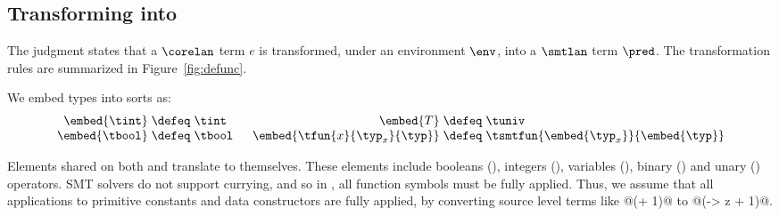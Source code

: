 \subsection{Transforming \corelan into \smtlan}
%
\label{subsec:embedding}


%
The judgment
states that a $\corelan$ term $e$ is transformed,
under an environment $\env$, into a
$\smtlan$ term $\pred$.
%
The transformation rules are summarized in Figure~\ref{fig:defunc}.

%
We embed \corelan types into \smtlan sorts as:
%
\[\arraycolsep=1.4pt
\begin{array}{rclcrcl}
\embed{\tint}                       & \defeq &  \tint & \quad &
\embed{T}                           & \defeq &  \tuniv \\
\embed{\tbool}                      & \defeq &  \tbool & \quad &
\embed{\tfun{x}{\typ_x}{\typ}} & \defeq & \tsmtfun{\embed{\typ_x}}{\embed{\typ}}
\end{array}
\]

%
Elements shared on both \corelan and \smtlan
translate to themselves.
%
These elements include
booleans (\lgbool),
integers (\lgint),
variables (\lgvar),
binary (\lgbinGEN)
and unary (\lgun)
operators.
%
SMT solvers do not support currying,
and so in \smtlan, all function symbols
must be fully applied.
%
Thus, we assume that all applications
to primitive constants and data
constructors are fully applied, \eg by converting
source level terms like @(+ 1)@ to
@(\z -> z + 1)@.
%



